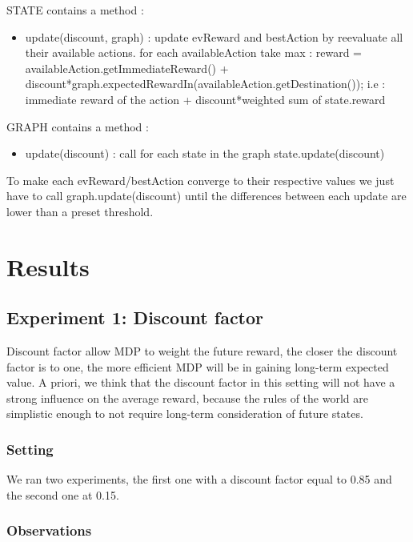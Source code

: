 \documentclass[11pt]{article}
\begin{document}
STATE contains a method :
\begin{itemize}
\item update(discount, graph) : update evReward and bestAction by reevaluate all
their available actions. for each availableAction take max : reward =
availableAction.getImmediateReward() +
discount*graph.expectedRewardIn(availableAction.getDestination()); i.e :
immediate reward of the action + discount*weighted sum of state.reward
\end{itemize}

GRAPH contains a method :
\begin{itemize}
\item update(discount) : call for each state in the graph state.update(discount)
\end{itemize}

To make each evReward/bestAction converge to their respective values we just
have to call graph.update(discount) until the differences between each update
are lower than a preset threshold.

\section{Results}


\subsection{Experiment 1: Discount factor}
Discount factor allow MDP to weight the future reward, the closer the discount
factor is to one, the more efficient MDP will be in gaining long-term expected
value. A priori, we think that the discount factor in this setting will not
have a strong influence on the average reward, because the rules of the world
are simplistic enough to not require long-term consideration of future states.

\subsubsection{Setting}
We ran two experiments, the first one with a discount factor equal to 0.85 and
the second one at 0.15.
\subsubsection{Observations}
\end{document}

